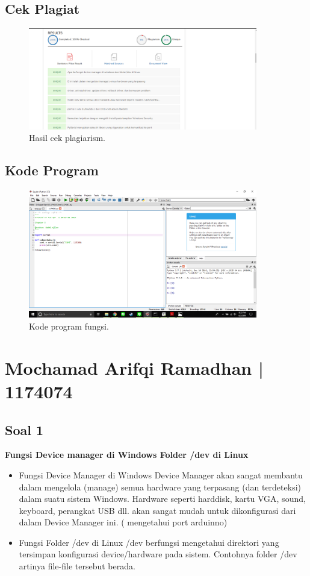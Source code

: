 \subsection{Cek Plagiat}
\begin{figure}[H]
	\includegraphics[width=10cm]{figures/5/1174083/Teori/plagiat1.png}
	\centering
	\caption{Hasil cek plagiarism.}
\end{figure}

\subsection{Kode Program}
\begin{figure}[ht]
	\includegraphics[width=10cm]{figures/5/1174083/Teori/kodefungsi.png}
	\centering
	\caption{Kode program fungsi.}
\end{figure}

\section{Mochamad Arifqi Ramadhan | 1174074}
\subsection{Soal 1}

\textbf{Fungsi Device manager di Windows  Folder /dev di Linux}
\begin{itemize}
\item Fungsi Device Manager di Windows
	Device Manager akan sangat membantu dalam mengelola (manage) semua hardware yang terpasang (dan terdeteksi) dalam suatu sistem Windows. Hardware seperti harddisk, kartu VGA, sound, keyboard, perangkat USB dll. akan sangat mudah untuk dikonfigurasi dari dalam Device Manager ini. ( mengetahui port arduinno)

\item Fungsi Folder /dev di Linux
/dev berfungsi mengetahui  direktori yang tersimpan konfigurasi device/hardware pada sistem. Contohnya folder /dev artinya file-file tersebut berada.
\end{itemize}
	
